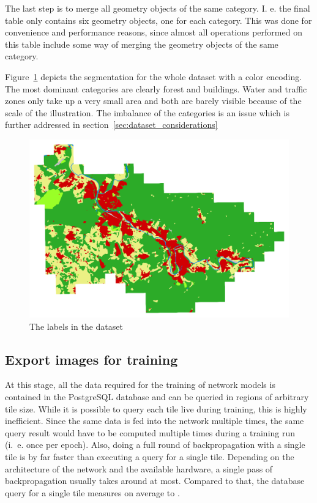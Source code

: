 The last step is to merge all geometry objects of the same category. I. e. the final table only contains six geometry objects, one for each category. This was done for convenience and performance reasons, since almost all operations performed on this table include some way of merging the geometry objects of the same category.

Figure~\ref{fig:dop_label_all} depicts the segmentation for the whole dataset with a color encoding. The most dominant categories are clearly forest and buildings. Water and traffic zones only take up a very small area and both are barely visible because of the scale of the illustration. The imbalance of the categories is an issue which is further addressed in section~\ref{sec:dataset_considerations}

\begin{figure}[h]
    \centering
    \includegraphics[width=\textwidth]{images/dop_label_all}
    \caption{The labels in the dataset}
    \label{fig:dop_label_all}
\end{figure}

\subsection{Export images for training}
At this stage, all the data required for the training of network models is contained in the PostgreSQL database and can be queried in regions of arbitrary tile size. While it is possible to query each tile live during training, this is highly inefficient. Since the same data is fed into the network multiple times, the same query result would have to be computed multiple times during a training run (i.~e. once per epoch). Also, doing a full round of backpropagation with a single tile is by far faster than executing a query for a single tile. Depending on the architecture of the network and the available hardware, a single pass of backpropagation usually takes around  at most. Compared to that, the database query for a single tile measures on average to .

